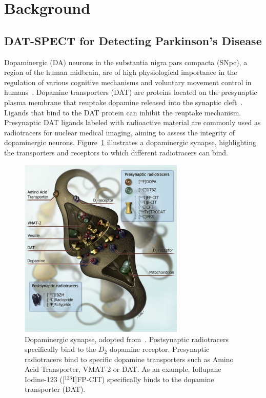 \section{Background}
\label{sec:background}

\subsection{DAT-SPECT for Detecting Parkinson's Disease}
\label{subsec:datspect}


Dopaminergic (DA) neurons in the substantia nigra pars compacta (SNpc), a region of the human midbrain, 
are of high physiological importance in the regulation of various cognitive mechanisms 
and voluntary movement control in humans~\citep{Luo2016-zj}.
Dopamine transporters (DAT) are proteins located on the presynaptic plasma membrane 
that reuptake dopamine released into the synaptic cleft~\citep{Giros1993-xb}.
Ligands that bind to the DAT protein can inhibit the reuptake mechanism.
Presynaptic DAT ligands labeled with radioactive material are commonly used as radiotracers for nuclear medical imaging,
aiming to assess the integrity of dopaminergic neurons.
Figure~\ref{fig:dat_tracer_synapse} illustrates a dopaminergic synapse, 
highlighting the transporters and receptors to which different radiotracers can bind.

\begin{figure}[ht]
  \centering
  \includegraphics[width=0.7\textwidth]{content/figures/da_synapse.png}
  \caption{Dopaminergic synapse, adopted from~\cite{Booij2008-hh}.
  Postsynaptic radiotracers specifically bind to the $D_2$ dopamine receptor. 
  Presynaptic radiotracers bind to specific dopamine transporters such as Amino Acid Transporter, VMAT-2 or DAT.
  As an example, Ioflupane Iodine-123 ([$^{123}$I]FP-CIT) specifically binds to the dopamine transporter (DAT).} 
  \label{fig:dat_tracer_synapse}
\end{figure}

